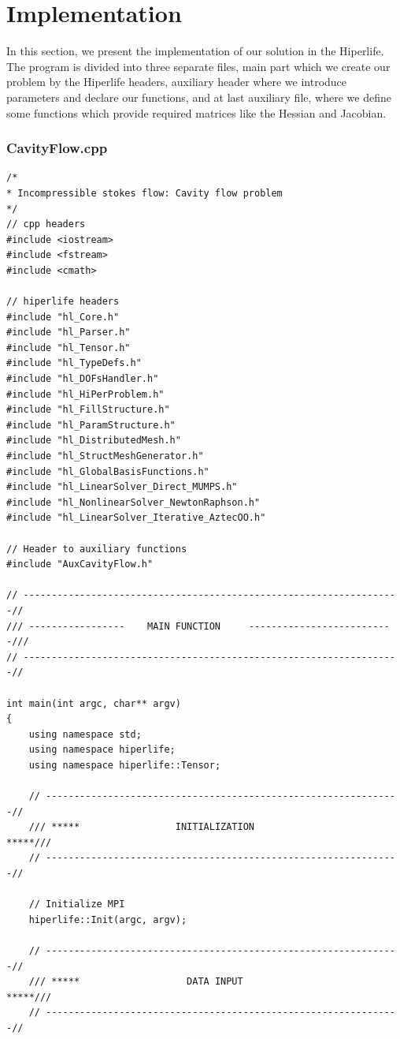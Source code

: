 \documentclass[]{article}
\begin{document}
\section{Implementation} \label{sec: imp}
In this section, we present the implementation of our solution in the Hiperlife. The program is divided into three separate files, main part which we create our problem by the Hiperlife headers, auxiliary header where we introduce parameters and declare our functions, and at last auxiliary file, where we define some functions which provide required matrices like the Hessian and Jacobian.
\subsubsection{CavityFlow.cpp} \label{sec: m.cpp}
\nolinenumbers
\begin{lstlisting}
/*
* Incompressible stokes flow: Cavity flow problem
*/
// cpp headers
#include <iostream>
#include <fstream>
#include <cmath>

// hiperlife headers
#include "hl_Core.h"
#include "hl_Parser.h"
#include "hl_Tensor.h"
#include "hl_TypeDefs.h"  
#include "hl_DOFsHandler.h"
#include "hl_HiPerProblem.h"
#include "hl_FillStructure.h"
#include "hl_ParamStructure.h"
#include "hl_DistributedMesh.h" 
#include "hl_StructMeshGenerator.h" 
#include "hl_GlobalBasisFunctions.h"
#include "hl_LinearSolver_Direct_MUMPS.h"
#include "hl_NonlinearSolver_NewtonRaphson.h"
#include "hl_LinearSolver_Iterative_AztecOO.h"

// Header to auxiliary functions
#include "AuxCavityFlow.h"

// -------------------------------------------------------------------//
/// -----------------    MAIN FUNCTION     --------------------------///
// -------------------------------------------------------------------//

int main(int argc, char** argv)
{
	using namespace std;
	using namespace hiperlife;
	using namespace hiperlife::Tensor;
	
	// ---------------------------------------------------------------//
	/// *****                 INITIALIZATION                    *****///
	// ---------------------------------------------------------------//
	
	// Initialize MPI
	hiperlife::Init(argc, argv);
	
	// ---------------------------------------------------------------//
	/// *****                   DATA INPUT                      *****///
	// ---------------------------------------------------------------//
	

\end{lstlisting}
\end{document}
